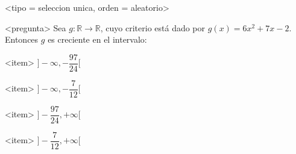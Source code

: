 <tipo = seleccion unica, orden = aleatorio>

<pregunta>
Sea $g:\mathbb R \to \mathbb R$, cuyo criterio est\'a dado por $g(x) = 6x^2 +7x -2$. Entonces $g$ es creciente en el intervalo:


<item>
$\bigg]{-}\infty, -\dfrac{97}{24}\bigg[$

<item>
$\bigg]{-}\infty, -\dfrac{7}{12}\bigg[$

<item>
$\bigg]-\dfrac{97}{24}, +\infty\bigg[$

<item>
$\bigg]-\dfrac{7}{12}, +\infty\bigg[$




